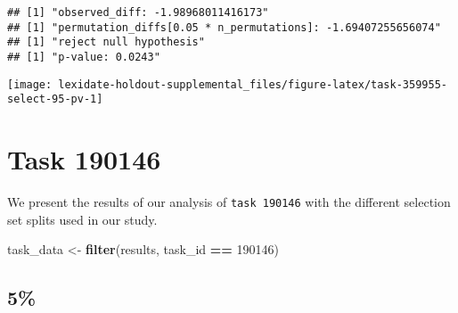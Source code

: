 \documentclass[
]{book}
\newenvironment{Shaded}{\begin{snugshade}}{\end{snugshade}}
\newcommand{\AttributeTok}[1]{\textcolor[rgb]{0.13,0.29,0.53}{#1}}
\newcommand{\DecValTok}[1]{\textcolor[rgb]{0.00,0.00,0.81}{#1}}
\newcommand{\FunctionTok}[1]{\textcolor[rgb]{0.13,0.29,0.53}{\textbf{#1}}}
\newcommand{\NormalTok}[1]{#1}
\newcommand{\OtherTok}[1]{\textcolor[rgb]{0.56,0.35,0.01}{#1}}
\newcommand{\SpecialCharTok}[1]{\textcolor[rgb]{0.81,0.36,0.00}{\textbf{#1}}}
\newcommand{\StringTok}[1]{\textcolor[rgb]{0.31,0.60,0.02}{#1}}
\begin{document}
\begin{Shaded}
\end{Shaded}

\begin{verbatim}
## [1] "observed_diff: -1.98968011416173"
## [1] "permutation_diffs[0.05 * n_permutations]: -1.69407255656074"
## [1] "reject null hypothesis"
## [1] "p-value: 0.0243"
\end{verbatim}

\texttt{[image: lexidate-holdout-supplemental\_files/figure-latex/task-359955-select-95-pv-1]}

\hypertarget{task-190146}{%
\chapter{Task 190146}\label{task-190146}}

We present the results of our analysis of \texttt{task\ 190146} with the different selection set splits used in our study.

\begin{Shaded}
\begin{Highlighting}[]
\NormalTok{task\_data }\OtherTok{\textless{}{-}} \FunctionTok{filter}\NormalTok{(results, task\_id }\SpecialCharTok{==} \DecValTok{190146}\NormalTok{)}
\end{Highlighting}
\end{Shaded}

\hypertarget{section-15}{%
\section{5\%}\label{section-15}}
\end{document}
